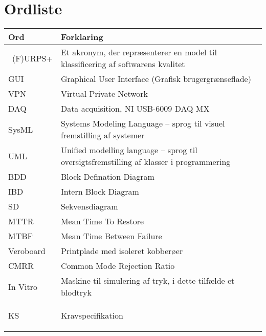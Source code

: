 \chapter{Ordliste}

\begin{longtabu} to 
    Ord &    Forklaring\\
    \toprule \
   (F)URPS+ 	&    Et akronym, der repræsenterer en model til klassificering af softwarens kvalitet \\
    GUI		&	Graphical User Interface (Grafisk brugergrænseflade)\\
    VPN		&	Virtual Private Network\\
    DAQ		&	Data acquisition, NI USB-6009 DAQ MX \\
    SysML	&   Systems Modeling Language – sprog til visuel fremstilling af systemer \\
    UML		& Unified modelling language – sprog til oversigtsfremstilling af klasser i programmering \\
    BDD 	&	Block Defination Diagram \\
	IBD		& 	Intern Block Diagram \\
	SD		& 	Sekvensdiagram \\
	MTTR	&	Mean Time To Restore \\
	MTBF	&	Mean Time Between Failure \\
	Veroboard & Printplade med isoleret kobberøer\\
	CMRR 	& 	Common Mode Rejection Ratio\\ 
	In Vitro &  Maskine til simulering af tryk, i dette tilfælde et blodtryk \\
	KS 		&	Kravspecifikation
 
\label{forkort}
\end{longtabu}